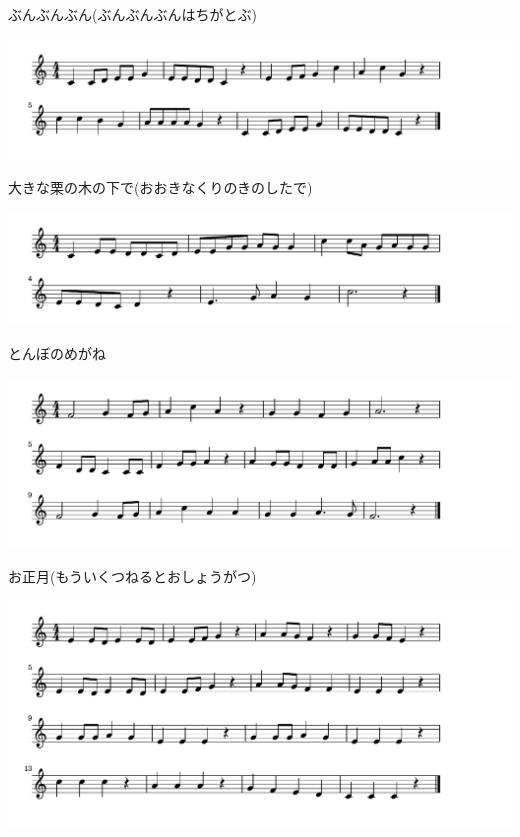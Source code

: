 \documentclass[a4paper]{ltjsarticle}
\begin{document}
\vspace{-10mm} \hspace{10mm}
ぶんぶんぶん(ぶんぶんぶんはちがとぶ)

\includegraphics[clip]{okinakuri_crop.pdf}

\vspace{-10mm} \hspace{10mm}
大きな栗の木の下で(おおきなくりのきのしたで)

\includegraphics[clip]{tonbono_crop.pdf}

\vspace{-10mm} \hspace{10mm}
とんぼのめがね

\includegraphics[clip]{oshogatsu_crop.pdf}

\vspace{-10mm} \hspace{10mm}
お正月(もういくつねるとおしょうがつ)

\includegraphics[clip]{tewotata_crop.pdf}
\end{document}
